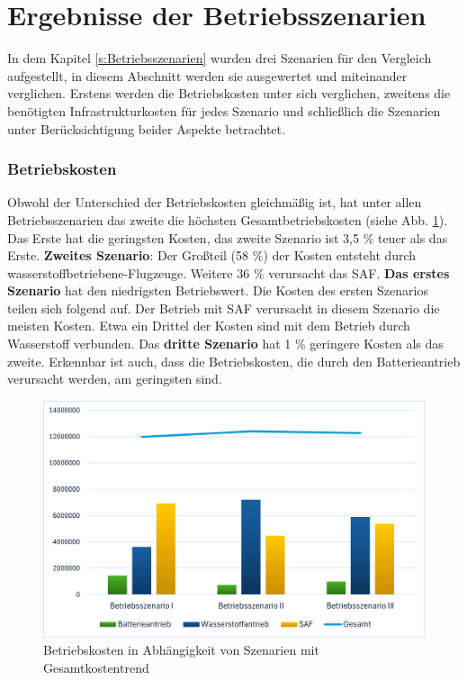 \section{Ergebnisse der Betriebsszenarien}
In dem Kapitel \ref{s:Betriebsszenarien} wurden drei Szenarien für den Vergleich aufgestellt, 
in diesem Abschnitt werden sie ausgewertet und miteinander verglichen. 
Erstens werden die Betriebskosten unter sich verglichen, 
zweitens die benötigten Infrastrukturkosten für jedes Szenario und schließlich 
die Szenarien unter Berücksichtigung beider Aspekte betrachtet.

\subsubsection{Betriebskosten}
Obwohl der Unterschied der Betriebskosten gleichmäßig ist, 
hat unter allen Betriebsszenarien das zweite die höchsten Gesamtbetriebskosten (siehe Abb. \ref{res_betriebsszenarien}). 
Das Erste hat die geringsten Kosten, das zweite Szenario ist 3,5 \% teuer als das Erste.
\textbf{Zweites Szenario}: Der Großteil (58 \%) der Kosten entsteht durch wasserstoffbetriebene-Flugzeuge. 
Weitere 36 \% verursacht das SAF.
\textbf{Das erstes Szenario} hat den niedrigsten Betriebswert. 
Die Kosten des ersten Szenarios teilen sich folgend auf. 
Der Betrieb mit SAF verursacht in diesem Szenario die meisten Kosten. 
Etwa ein Drittel der Kosten sind mit dem Betrieb durch Wasserstoff verbunden.
Das \textbf{dritte Szenario} hat 1 \% geringere Kosten als das zweite.
Erkennbar ist auch, dass die Betriebskosten, die durch den Batterieantrieb verursacht werden, 
am geringsten sind.
\begin{figure}[h]
	\centering
	\includegraphics[width=0.8\linewidth]{Bilder/betriebssz_res.png}
	\caption[Betriebskosten in Abhängigkeit von Szenarien mit Gesamtkostentrend]{Betriebskosten in Abhängigkeit von Szenarien mit Gesamtkostentrend}
	\label{res_betriebsszenarien}
\end{figure}

